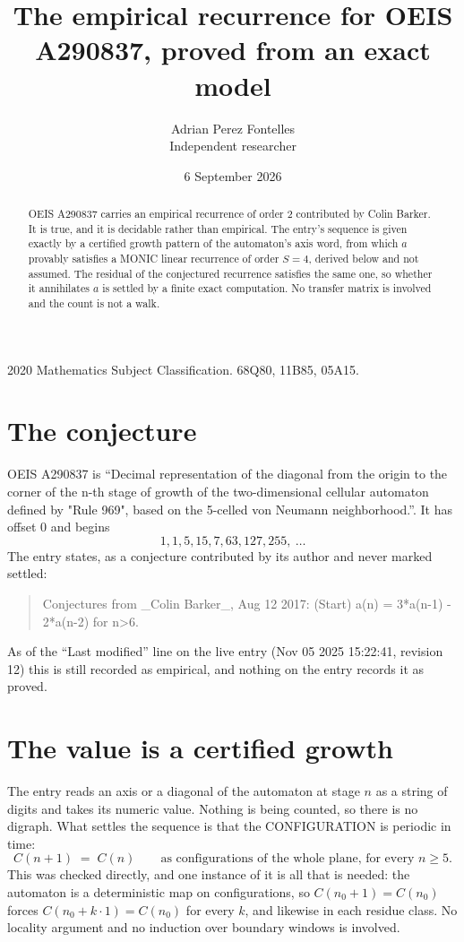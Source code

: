 \documentclass[11pt,a4paper]{article}
\title{The empirical recurrence for OEIS A290837, proved from an exact model}
\author{Adrian Perez Fontelles\\ \small Independent researcher}
\date{6 September 2026}
\theoremstyle{plain}
\theoremstyle{definition}
\begin{document}
\maketitle

\begin{abstract}
OEIS A290837 carries an empirical recurrence of order $2$ contributed by Colin Barker. It is true, and it is
decidable rather than empirical. The entry's sequence is given exactly by a certified growth pattern of the automaton's axis word, from
which $a$ provably satisfies a MONIC linear recurrence of order $S=4$, derived below and not
assumed. The residual of the conjectured recurrence satisfies the same one, so whether it
annihilates $a$ is settled by a finite exact computation. No transfer matrix is involved and
the count is not a walk.
\end{abstract}

\noindent\small 2020 Mathematics Subject Classification. 68Q80, 11B85, 05A15.\normalsize

\section{The conjecture}

OEIS A290837 is ``Decimal representation of the diagonal from the origin to the corner of the n-th stage of growth of the two-dimensional cellular automaton defined by "Rule 969", based on the 5-celled von Neumann neighborhood.''. It has offset $0$ and begins
\[
1, 1, 5, 15, 7, 63, 127, 255,\ \dots
\]
The entry states, as a conjecture contributed by its author and never marked settled:
\begin{quote}
Conjectures from \_Colin Barker\_, Aug 12 2017: (Start) a(n) = 3*a(n-1) - 2*a(n-2) for n>6.
\end{quote}
As of the ``Last modified'' line on the live entry (Nov 05 2025 15:22:41, revision 12)
this is still recorded as empirical, and nothing on the entry records it as proved.

\section{The value is a certified growth}

The entry reads an axis or a diagonal of the automaton at stage $n$ as a string of digits and
takes its numeric value. Nothing is being counted, so there is no digraph. What settles the
sequence is that the CONFIGURATION is periodic in time:
\[
C(n+1)\;=\;C(n)\qquad\text{as configurations of the whole plane, for every } n\ge 5.
\]
This was checked directly, and one instance of it is all that is needed: the automaton is a
deterministic map on configurations, so $C(n_0+1)=C(n_0)$ forces $C(n_0+k\cdot1)=C(n_0)$ for
every $k$, and likewise in each residue class. No locality argument and no induction over
boundary windows is involved.
\end{document}
